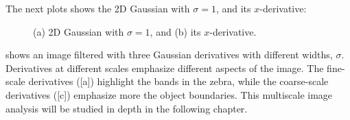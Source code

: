 The next plots shows the 2D Gaussian with $\sigma=1$, and its $x$-derivative:
\vspace{-.2in}
\begin{figure}[h]
	\centerline{
	}
	\caption{(a) 2D Gaussian with $\sigma=1$, and (b) its $x$-derivative.}
\end{figure}
\vspace{-.2in}


\Fig{\ref{fig:gaussiander_zebra}} shows an image filtered with three Gaussian derivatives with different widths, $\sigma$. Derivatives at different scales emphasize different aspects of the image. The fine-scale derivatives (\fig{\ref{fig:gaussiander_zebra}}[a]) highlight the bands in the zebra, while the coarse-scale derivatives (\fig{\ref{fig:gaussiander_zebra}}[c]) emphasize more the object boundaries. This multiscale image analysis will be studied in depth in the following chapter.

